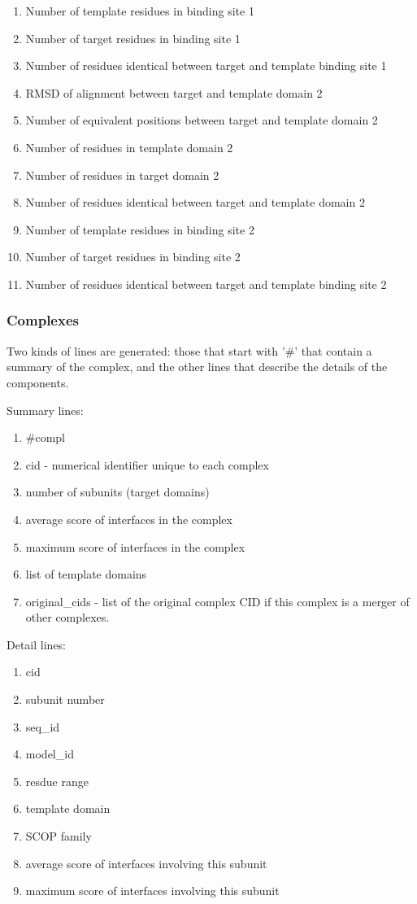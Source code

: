\documentclass[11pt]{article}
\begin{document}
\begin{enumerate}
\item Number of template residues in binding site 1
\item Number of target residues in binding site 1
\item Number of residues identical between target and template binding site 1
\item RMSD of alignment between target and template domain 2
\item Number of equivalent positions between target and template domain 2
\item Number of residues in template domain 2
\item Number of residues in target domain 2
\item Number of residues identical between target and template domain 2
\item Number of template residues in binding site 2
\item Number of target residues in binding site 2
\item Number of residues identical between target and template binding site 2
\end{enumerate}

\subsubsection{Complexes}
Two kinds of lines are generated: those that start with '\#' that contain a summary of the complex, and the other lines that describe the details of the components.

Summary lines:
\begin{enumerate}
\item \#compl
\item cid - numerical identifier unique to each complex
\item number of subunits (target domains)
\item average score of interfaces in the complex
\item maximum score of interfaces in the complex
\item list of template domains
\item original\_cids - list of the original complex CID if this complex is a merger of other complexes.
\end{enumerate}

Detail lines:
\begin{enumerate}
\item cid
\item subunit number
\item seq\_id
\item model\_id
\item resdue range
\item template domain
\item SCOP family
\item average score of interfaces involving this subunit
\item maximum score of interfaces involving this subunit
\end{enumerate}
\end{document}

